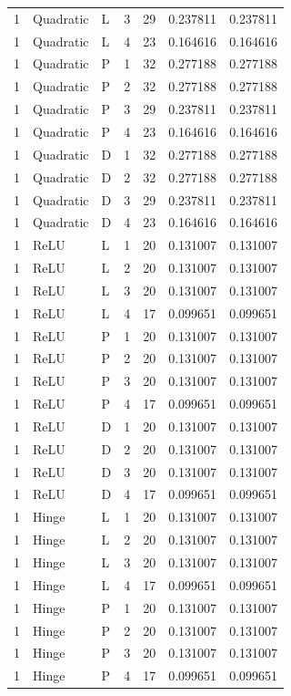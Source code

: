 \begin{longtable}{lllrrrr}
1 & Quadratic & L & 3 & 29 & 0.237811 & 0.237811 \\
1 & Quadratic & L & 4 & 23 & 0.164616 & 0.164616 \\
1 & Quadratic & P & 1 & 32 & 0.277188 & 0.277188 \\
1 & Quadratic & P & 2 & 32 & 0.277188 & 0.277188 \\
1 & Quadratic & P & 3 & 29 & 0.237811 & 0.237811 \\
1 & Quadratic & P & 4 & 23 & 0.164616 & 0.164616 \\
1 & Quadratic & D & 1 & 32 & 0.277188 & 0.277188 \\
1 & Quadratic & D & 2 & 32 & 0.277188 & 0.277188 \\
1 & Quadratic & D & 3 & 29 & 0.237811 & 0.237811 \\
1 & Quadratic & D & 4 & 23 & 0.164616 & 0.164616 \\
1 & ReLU & L & 1 & 20 & 0.131007 & 0.131007 \\
1 & ReLU & L & 2 & 20 & 0.131007 & 0.131007 \\
1 & ReLU & L & 3 & 20 & 0.131007 & 0.131007 \\
1 & ReLU & L & 4 & 17 & 0.099651 & 0.099651 \\
1 & ReLU & P & 1 & 20 & 0.131007 & 0.131007 \\
1 & ReLU & P & 2 & 20 & 0.131007 & 0.131007 \\
1 & ReLU & P & 3 & 20 & 0.131007 & 0.131007 \\
1 & ReLU & P & 4 & 17 & 0.099651 & 0.099651 \\
1 & ReLU & D & 1 & 20 & 0.131007 & 0.131007 \\
1 & ReLU & D & 2 & 20 & 0.131007 & 0.131007 \\
1 & ReLU & D & 3 & 20 & 0.131007 & 0.131007 \\
1 & ReLU & D & 4 & 17 & 0.099651 & 0.099651 \\
1 & Hinge & L & 1 & 20 & 0.131007 & 0.131007 \\
1 & Hinge & L & 2 & 20 & 0.131007 & 0.131007 \\
1 & Hinge & L & 3 & 20 & 0.131007 & 0.131007 \\
1 & Hinge & L & 4 & 17 & 0.099651 & 0.099651 \\
1 & Hinge & P & 1 & 20 & 0.131007 & 0.131007 \\
1 & Hinge & P & 2 & 20 & 0.131007 & 0.131007 \\
1 & Hinge & P & 3 & 20 & 0.131007 & 0.131007 \\
1 & Hinge & P & 4 & 17 & 0.099651 & 0.099651 \\

\end{longtable}

